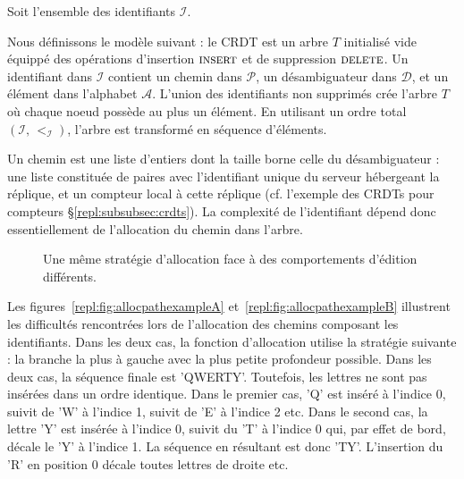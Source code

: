 Soit l'ensemble des identifiants $\mathcal{I}$.


Nous définissons le modèle suivant : le CRDT est un arbre $T$ initialisé vide
équippé des opérations d'insertion $\textsc{insert}$ et de suppression
$\textsc{delete}$. Un identifiant dans $\mathcal{I}$ contient un chemin dans
$\mathcal{P}$, un désambiguateur dans $\mathcal{D}$, et un élément dans
l'alphabet $\mathcal{A}$. L'union des identifiants non supprimés crée l'arbre
$T$ où chaque noeud possède au plus un élément.  En utilisant un ordre total
$(\mathcal{I},\, <_\mathcal{I})$, l'arbre est transformé en séquence d'éléments.

Un chemin est une liste d'entiers dont la taille borne celle du désambiguateur :
une liste constituée de paires avec l'identifiant unique du serveur hébergeant
la réplique, et un compteur local à cette réplique (cf. l'exemple des CRDTs pour
compteurs §\ref{repl:subsubsec:crdts}). La complexité de l'identifiant dépend donc
essentiellement de l'allocation du chemin dans l'arbre.

\begin{figure}
  \begin{center}
  \hspace{30pt}
  \end{center}
  \caption{Une même stratégie d'allocation face à des comportements d'édition
    différents.}
\end{figure}

Les figures~\ref{repl:fig:allocpathexampleA} et~\ref{repl:fig:allocpathexampleB}
illustrent les difficultés rencontrées lors de l'allocation des chemins
composant les identifiants. Dans les deux cas, la fonction d'allocation utilise
la stratégie suivante : la branche la plus à gauche avec la plus petite
profondeur possible. Dans les deux cas, la séquence finale est
'QWERTY'. Toutefois, les lettres ne sont pas insérées dans un ordre
identique. Dans le premier cas, 'Q' est inséré à l'indice 0, suivit de 'W' à
l'indice 1, suivit de 'E' à l'indice 2 etc.  Dans le second cas, la lettre 'Y'
est insérée à l'indice 0, suivit du 'T' à l'indice 0 qui, par effet de bord,
décale le 'Y' à l'indice 1. La séquence en résultant est donc 'TY'. L'insertion
du 'R' en position 0 décale toutes lettres de droite etc.


